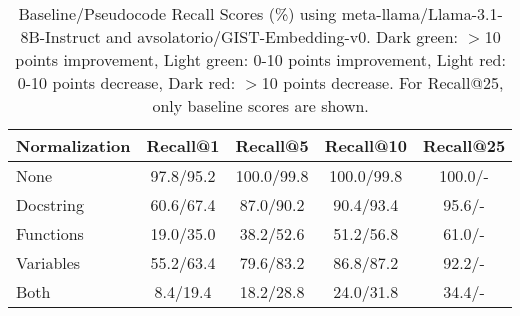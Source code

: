 \begin{table}[h]
\centering
\begin{tabular}{l|ccc|c}
\toprule
\textbf{Normalization} & \textbf{Recall@1} & \textbf{Recall@5} & \textbf{Recall@10} & \textbf{Recall@25} \\
\midrule
None & \cellcolor{lightred}97.8/95.2 & \cellcolor{lightred}100.0/99.8 & \cellcolor{lightred}100.0/99.8 & 100.0/- \\
Docstring & \cellcolor{lightgreen}60.6/67.4 & \cellcolor{lightgreen}87.0/90.2 & \cellcolor{lightgreen}90.4/93.4 & 95.6/- \\
Functions & \cellcolor{darkgreen}19.0/35.0 & \cellcolor{darkgreen}38.2/52.6 & \cellcolor{lightgreen}51.2/56.8 & 61.0/- \\
Variables & \cellcolor{lightgreen}55.2/63.4 & \cellcolor{lightgreen}79.6/83.2 & \cellcolor{lightgreen}86.8/87.2 & 92.2/- \\
Both & \cellcolor{darkgreen}8.4/19.4 & \cellcolor{darkgreen}18.2/28.8 & \cellcolor{lightgreen}24.0/31.8 & 34.4/- \\
\bottomrule
\end{tabular}
\caption{Baseline/Pseudocode Recall Scores (\%) using meta-llama/Llama-3.1-8B-Instruct and avsolatorio/GIST-Embedding-v0. Dark green: $>$10 points improvement, Light green: 0-10 points improvement, Light red: 0-10 points decrease, Dark red: $>$10 points decrease. For Recall@25, only baseline scores are shown.}
\label{tab:pseudo-scores-llama_3.1_8b_instruct}
\end{table}
